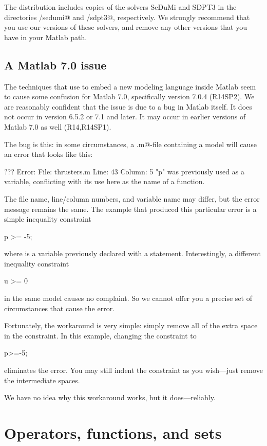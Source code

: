 \documentclass[12pt]{article}
\begin{document}
The \cvx distribution includes copies of the solvers SeDuMi and SDPT3 in
the directories \verb@cvx/sedumi@ and \verb@cvx/sdpt3@, respectively. 
We strongly recommend that you use our versions of these solvers,
and remove any other versions that you have in your Matlab path.

\subsection{A Matlab 7.0 issue}
\label{sec:sevenprob}

The techniques that \cvx use to embed a new modeling language inside Matlab
seem to cause some confusion for Matlab 7.0, specifically version 7.0.4 (R14SP2). 
We are reasonably confident
that the issue is due to a bug in Matlab itself. It does not occur in version
6.5.2 or 7.1 and later. It may occur in earlier versions of
Matlab 7.0 as well (R14,R14SP1).

The bug is this: in  some circumstances, a \verb@.m@-file containing a \cvx model will cause
an error that looks like this:
\begin{code}
	??? Error: File: thrusters.m Line: 43 Column: 5
	"p" was previously used as a variable,
	conflicting with its use here as the name of a function.
\end{code}
The file name, line/column numbers, and variable name may differ, 
but the error message remains the same. The example that produced this particular 
error is a simple inequality constraint
\begin{code}
	p >= -5;
\end{code}
where \verb@p@ is a \cvx variable previously declared with a \verb@variable@ statement.
Interestingly, a different inequality constraint
\begin{code}
	u >= 0
\end{code}
in the same model causes no complaint. So we cannot offer you a precise set
of circumstances that cause the error.

Fortunately, the workaround is very simple: simply remove all of the extra space
in the constraint. In this example, changing the constraint to
\begin{code}
	p>=-5;
\end{code}
eliminates the error. You may still indent the constraint as you wish---just
remove the intermediate spaces.

We have no idea why this workaround works, but it does---reliably.

\newpage
\section{Operators, functions, and sets}
\label{s-functions}
\end{document}
